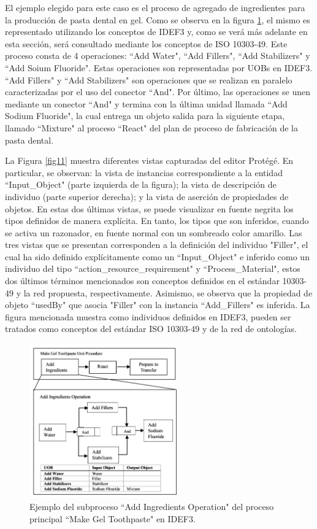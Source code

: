 \documentclass[journal]{IEEEtran}
\begin{document}
El ejemplo elegido para este caso es el proceso de agregado de ingredientes para la producci\'on de pasta dental en gel. Como se observa en la figura \ref{fig10}, el mismo es representado utilizando los conceptos de IDEF3 y, como se ver\'a m\'as adelante en esta secci\'on, ser\'a consultado mediante los conceptos de ISO 10303-49. Este proceso consta de 4 operaciones: ``Add Water", ``Add Fillers", ``Add Stabilizers" y ``Add Soium Fluoride". Estas operaciones son representadas por UOBs en IDEF3. ``Add Fillers" y ``Add Stabilizers" son operaciones que se realizan en paralelo caracterizadas por el uso del conector ``And". Por \'ultimo, las operaciones se unen mediante un conector ``And" y termina con la \'ultima unidad llamada ``Add Sodium Fluoride", la cual entrega un objeto salida para la siguiente etapa, llamado ``Mixture" al proceso ``React" del plan de proceso de fabricaci\'on de la pasta dental.

La Figura \ref{fig11} muestra diferentes vistas capturadas del editor Prot\'eg\'e. En particular, se observan: la vista de instancias correspondiente a la entidad ``Input\_Object" (parte izquierda de la figura); la vista de descripci\'on de individuo (parte superior derecha); y la vista de aserci\'on de propiedades de objetos. En estas dos \'ultimas vistas, se puede visualizar en fuente negrita los tipos definidos de manera expl\'icita. En tanto, los tipos que son inferidos, cuando se activa un razonador, en fuente normal con un sombreado color amarillo.  Las tres vistas que se presentan corresponden a la definici\'on del individuo "Filler", el cual ha sido definido expl\'icitamente como un ``Input\_Object" e inferido como un individuo del tipo ``action\_resource\_requirement" y ``Process\_Material", estos dos \'ultimos t\'erminos mencionados son conceptos definidos en el est\'andar 10303-49 y la red propuesta, respectivamente. Asimismo, se observa que la propiedad de objeto ``usedBy" que asocia "Filler" con la instancia ``Add\_Fillers" es inferida. La figura mencionada muestra como individuos definidos en IDEF3, pueden ser tratados como conceptos del est\'andar ISO 10303-49 y de la red de ontolog\'ias.


\begin{figure}[!t]
\centering
\includegraphics[width=2.5in]{figures/figure10.png}
\caption{Ejemplo del subproceso ``Add Ingredients Operation" del proceso principal ``Make Gel Toothpaste" en IDEF3.}
\label{fig10}
\end{figure}
\end{document}
